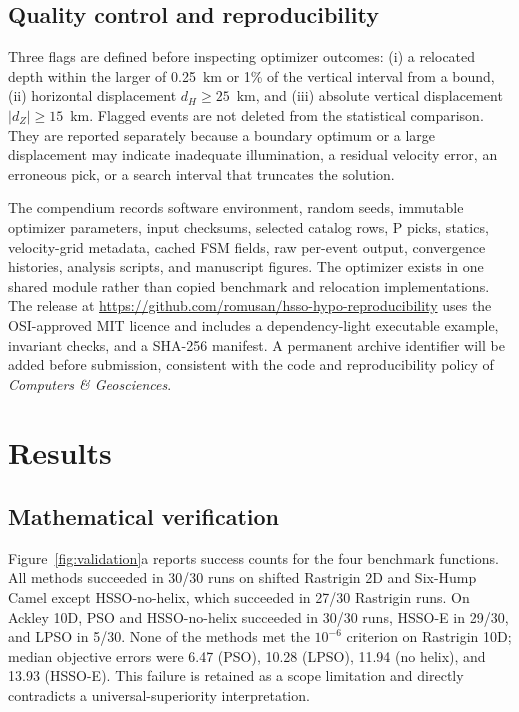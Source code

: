 \documentclass[10pt]{article}
\begin{document}
\subsection{Quality control and reproducibility}

Three flags are defined before inspecting optimizer outcomes: (i) a relocated depth within the larger of 0.25~km or 1\% of the vertical interval from a bound, (ii) horizontal displacement $d_H\geq25$~km, and (iii) absolute vertical displacement $|d_Z|\geq15$~km. Flagged events are not deleted from the statistical comparison. They are reported separately because a boundary optimum or a large displacement may indicate inadequate illumination, a residual velocity error, an erroneous pick, or a search interval that truncates the solution.

The compendium records software environment, random seeds, immutable optimizer parameters, input checksums, selected catalog rows, P picks, statics, velocity-grid metadata, cached FSM fields, raw per-event output, convergence histories, analysis scripts, and manuscript figures. The optimizer exists in one shared module rather than copied benchmark and relocation implementations. The release at \url{https://github.com/romusan/hsso-hypo-reproducibility} uses the OSI-approved MIT licence and includes a dependency-light executable example, invariant checks, and a SHA-256 manifest. A permanent archive identifier will be added before submission, consistent with the code and reproducibility policy of \textit{Computers \& Geosciences}.

\section{Results}

\subsection{Mathematical verification}

Figure~\ref{fig:validation}a reports success counts for the four benchmark functions. All methods succeeded in 30/30 runs on shifted Rastrigin 2D and Six-Hump Camel except HSSO-no-helix, which succeeded in 27/30 Rastrigin runs. On Ackley 10D, PSO and HSSO-no-helix succeeded in 30/30 runs, HSSO-E in 29/30, and LPSO in 5/30. None of the methods met the $10^{-6}$ criterion on Rastrigin 10D; median objective errors were 6.47 (PSO), 10.28 (LPSO), 11.94 (no helix), and 13.93 (HSSO-E). This failure is retained as a scope limitation and directly contradicts a universal-superiority interpretation.
\end{document}
